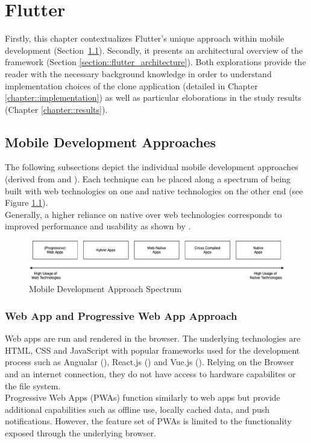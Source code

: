 \chapter{Flutter}
Firstly, this chapter contextualizes Flutter's unique approach within mobile development (Section~\ref{section::other_architectures}). 
Secondly, it presents an architectural overview of the framework (Section \ref{section::flutter_architecture}). 
Both explorations provide the reader with the necessary background knowledge in order to understand implementation choices of the clone application (detailed in Chapter \ref{chapter::implementation}) 
as well as particular eloborations in the study results (Chapter \ref{chapter::results}).

\section{Mobile Development Approaches} \label{section::other_architectures}
The following subsections depict the individual mobile development approaches (derived from \cite{Heitkoetter2013} and \cite{Cunha2018}).
Each technique can be placed along a spectrum of being built with web technologies on one and native technologies on the other end (see Figure \ref{fig::mobile_development_approach_spectrum}).\\
Generally, a higher reliance on native over web technologies corresponds to improved performance and usability as shown by \textcite{Heitkoetter2013}.

\begin{figure}
    \centering
    \includegraphics[width=\linewidth]{images/architectures/mobile_development_approaches.eps}
    \caption{Mobile Development Approach Spectrum}
    \label{fig::mobile_development_approach_spectrum}
\end{figure}


\subsection{Web App and Progressive Web App Approach} \label{subsection::web_apps}
Web apps are run and rendered in the browser. The underlying technologies are HTML, CSS and JavaScript with popular frameworks 
used for the development process such as Angualar (\cite{Angular2021}), React.js (\cite{React2021}) and Vue.js (\cite{Vue2021}). 
Relying on the Browser and an internet connection, they do not have access to hardware capabilites or the file system.\\
Progressive Web Apps (PWAs) function similarly to web apps but provide additional capabilities such as offline use, locally cached data, 
and push notifications. However, the feature set of PWAs is limited to the functionality exposed through the underlying browser.

